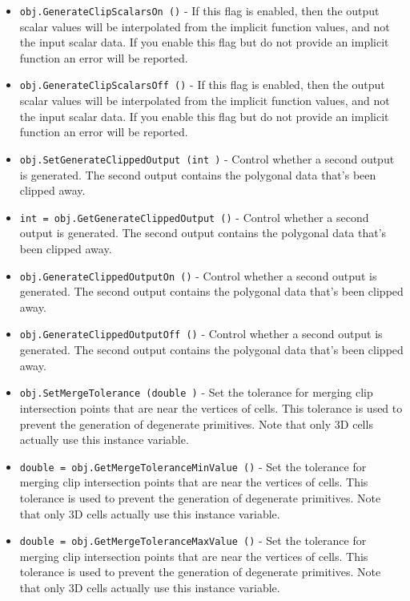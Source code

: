 \begin{itemize}
\item  \verb|obj.GenerateClipScalarsOn ()| -  If this flag is enabled, then the output scalar values will be 
 interpolated from the implicit function values, and not the 
 input scalar data. If you enable this flag but do not provide an
 implicit function an error will be reported.

\item  \verb|obj.GenerateClipScalarsOff ()| -  If this flag is enabled, then the output scalar values will be 
 interpolated from the implicit function values, and not the 
 input scalar data. If you enable this flag but do not provide an
 implicit function an error will be reported.

\item  \verb|obj.SetGenerateClippedOutput (int )| -  Control whether a second output is generated. The second output
 contains the polygonal data that's been clipped away.

\item  \verb|int = obj.GetGenerateClippedOutput ()| -  Control whether a second output is generated. The second output
 contains the polygonal data that's been clipped away.

\item  \verb|obj.GenerateClippedOutputOn ()| -  Control whether a second output is generated. The second output
 contains the polygonal data that's been clipped away.

\item  \verb|obj.GenerateClippedOutputOff ()| -  Control whether a second output is generated. The second output
 contains the polygonal data that's been clipped away.

\item  \verb|obj.SetMergeTolerance (double )| -  Set the tolerance for merging clip intersection points that are near
 the vertices of cells. This tolerance is used to prevent the generation
 of degenerate primitives. Note that only 3D cells actually use this
 instance variable.

\item  \verb|double = obj.GetMergeToleranceMinValue ()| -  Set the tolerance for merging clip intersection points that are near
 the vertices of cells. This tolerance is used to prevent the generation
 of degenerate primitives. Note that only 3D cells actually use this
 instance variable.

\item  \verb|double = obj.GetMergeToleranceMaxValue ()| -  Set the tolerance for merging clip intersection points that are near
 the vertices of cells. This tolerance is used to prevent the generation
 of degenerate primitives. Note that only 3D cells actually use this
 instance variable.


\end{itemize}
